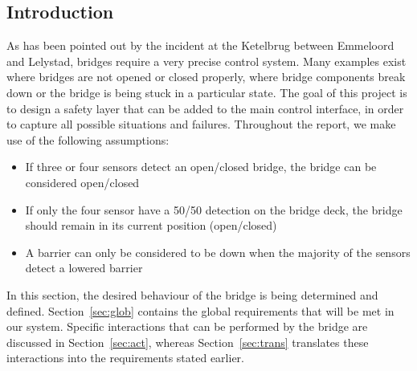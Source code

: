 \subsection{Introduction}

As has been pointed out by the incident at the Ketelbrug between Emmeloord and
Lelystad, bridges require a very precise control system.  Many examples exist
where bridges are not opened or closed properly, where bridge components break
down or the bridge is being stuck in a particular state. The goal of this
project is to design a safety layer that can be added to the main control
interface, in order to capture all possible situations and failures.
Throughout the report, we make use of the following assumptions:
%
\begin{itemize}
	\item If three or four sensors detect an open/closed bridge, the bridge can
	      be considered open/closed
	\item If only the four sensor have a 50/50 detection on the bridge deck,
	      the bridge should remain in its current position (open/closed)
	\item A barrier can only be considered to be down when the majority of the
	      sensors detect a lowered barrier
\end{itemize}
%
In this section, the desired behaviour of the bridge is being determined and
defined. Section~\ref{sec:glob} contains the global requirements that will be
met in our system. Specific interactions that can be performed by the bridge
are discussed in Section~\ref{sec:act}, whereas Section~\ref{sec:trans}
translates these interactions into the requirements stated earlier.
